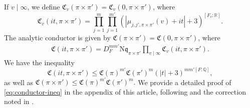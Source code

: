 \documentclass[12pt,reqno]{amsart}
\theoremstyle{remark}
\renewcommand{\Re}{\mathrm{Re}}
\newcommand{\N}{\mathrm{N}}
\newcommand{\R}{\mathbb{R}}
\newcommand{\Q}{\mathbb{Q}}
\newcommand{\kp}{\mathfrak{p}}
\newcommand{\kq}{\mathfrak{q}}
\numberwithin{equation}{section}
\begin{document}
	If $v \mid \infty$, we define $\mathfrak{C}_v( \pi\times\pi') = \mathfrak{C}_v(0, \pi\times\pi')$, where
    \[
    \mathfrak{C}_v(it, \pi\times\pi') = \prod_{j=1}^m \prod_{j=1}^{m'} (|\mu_{j,j',\pi\times{\pi}'}(v)+it|+3)^{[F_v:\R]}.
    \]
    The analytic conductor  is given by $\mathfrak{C}(\pi\times\pi') = \mathfrak{C}(0, \pi\times\pi')$, where
	\begin{equation*}
	    \begin{aligned}
	        \mathfrak{C}(it, \pi\times\pi')=D_F^{mm'}\N\kq_{\pi\times{\pi}'}\prod_{v\mid\infty} \mathfrak{C}_v(it, \pi\times\pi').
	    \end{aligned}
	\end{equation*}
    We have the inequality    \begin{equation}\label{eq:conductor-ineq}
        \mathfrak{C}(it, \pi\times \pi') \le  \mathfrak{C}(\pi)^{m'}\mathfrak{C}(\pi')^m(|t|+3)^{mm'[F:\Q]},
    \end{equation}
    as well as $\mathfrak{C}(\pi \times \pi') \le \mathfrak{C}(\pi)^{m'}\mathfrak{C}(\pi')^{m}.$ 
    We provide a detailed proof of \eqref{eq:conductor-ineq} in the appendix of this article, following \cite[Theorem A.2]{Humphries-Brumley} and the correction noted in \cite[P. 9]{Ramakrishnan-Yang}. 


\end{document}
